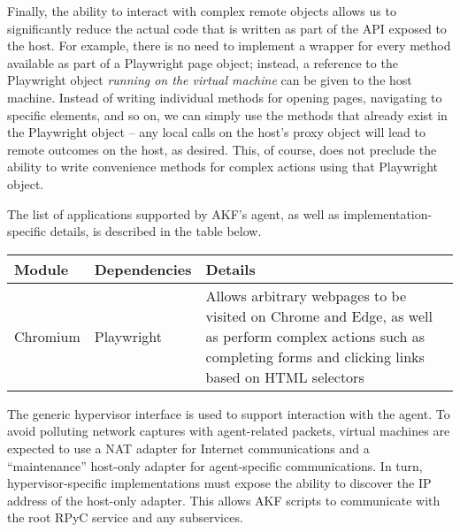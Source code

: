 \documentclass[letterpaper,12pt]{report}
\begin{document}
Finally, the ability to interact with complex remote objects allows us
to significantly reduce the actual code that is written as part of the
API exposed to the host. For example, there is no need to implement a
wrapper for every method available as part of a Playwright page object;
instead, a reference to the Playwright object \emph{running on the
virtual machine} can be given to the host machine. Instead of writing
individual methods for opening pages, navigating to specific elements,
and so on, we can simply use the methods that already exist in the
Playwright object -- any local calls on the host's proxy object will
lead to remote outcomes on the host, as desired. This, of course, does
not preclude the ability to write convenience methods for complex
actions using that Playwright object.

The list of applications supported by AKF's agent, as well as
implementation-specific details, is described in the table below.

\begin{longtable}[]{@{}
  >{\raggedright\arraybackslash}p{}
  >{\raggedright\arraybackslash}p{}
  >{\raggedright\arraybackslash}p{}@{}}
\toprule\noalign{}
\begin{minipage}[b]{\linewidth}\raggedright
Module
\end{minipage} & \begin{minipage}[b]{\linewidth}\raggedright
Dependencies
\end{minipage} & \begin{minipage}[b]{\linewidth}\raggedright
Details
\end{minipage} \\
\midrule\noalign{}
\endhead
\bottomrule\noalign{}
\endlastfoot
Chromium & Playwright \cite{MicrosoftPlaywrightpython2025} & Allows
arbitrary webpages to be visited on Chrome and Edge, as well as perform
complex actions such as completing forms and clicking links based on
HTML selectors \\
\end{longtable}

The generic hypervisor interface is used to support interaction with the
agent. To avoid polluting network captures with agent-related packets,
virtual machines are expected to use a NAT adapter for Internet
communications and a ``maintenance'' host-only adapter for
agent-specific communications. In turn, hypervisor-specific
implementations must expose the ability to discover the IP address of
the host-only adapter. This allows AKF scripts to communicate with the
root RPyC service and any subservices.
\end{document}
